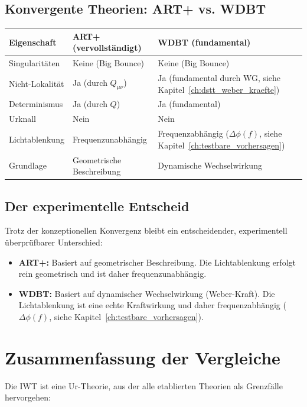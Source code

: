 \subsection{Konvergente Theorien: ART+ vs. WDBT}
\label{sub:vergleich_art_vs_wdbt}

\begin{tabular}{|l|l|l|}
\hline
\textbf{Eigenschaft} & \textbf{ART+ (vervollständigt)} & \textbf{WDBT (fundamental)} \\
\hline
Singularitäten & Keine (Big Bounce) & Keine (Big Bounce) \\
Nicht-Lokalität & Ja (durch \( Q_{\mu\nu} \)) & Ja (fundamental durch WG, siehe Kapitel~\ref{ch:dstt_weber_kraefte}) \\
Determinismus & Ja (durch \( Q \)) & Ja (fundamental) \\
Urknall & Nein & Nein \\
Lichtablenkung & Frequenzunabhängig & Frequenzabhängig (\( \Delta\phi(f) \), siehe Kapitel~\ref{ch:testbare_vorhersagen}) \\
Grundlage & Geometrische Beschreibung & Dynamische Wechselwirkung \\
\hline
\end{tabular}

\subsection{Der experimentelle Entscheid}
\label{sub:vergleich_art_entscheid}

Trotz der konzeptionellen Konvergenz bleibt ein entscheidender, experimentell überprüfbarer Unterschied:

\begin{itemize}
    \item \textbf{ART+:} Basiert auf geometrischer Beschreibung. Die Lichtablenkung erfolgt rein geometrisch und ist daher frequenzunabhängig.
    \item \textbf{WDBT:} Basiert auf dynamischer Wechselwirkung (Weber-Kraft). Die Lichtablenkung ist eine echte Kraftwirkung und daher frequenzabhängig (\( \Delta\phi(f) \), siehe Kapitel~\ref{ch:testbare_vorhersagen}).
\end{itemize}

\section{Zusammenfassung der Vergleiche}
\label{app:vergleich_zusammenfassung}

Die IWT ist eine Ur-Theorie, aus der alle etablierten Theorien als Grenzfälle hervorgehen:

